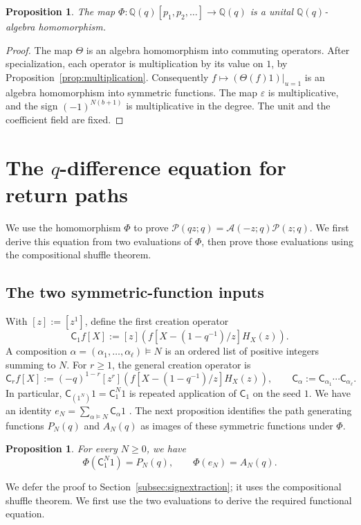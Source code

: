 \documentclass[12pt,reqno]{amsart}
\numberwithin{equation}{section}
\newtheorem{proposition}[theorem]{Proposition}
\theoremstyle{definition}
\theoremstyle{remark}
\theoremstyle{plain}
\newcommand{\QQ}{\mathbb Q}
\newcommand{\Cop}{\mathsf C}
\newcommand{\Aseries}{\mathscr A}
\newcommand{\Pseries}{\mathscr P}
\begin{document}
\begin{proposition}\label{prop:PhiHom}
The map $\Phi:\QQ(q)[p_1,p_2,\ldots]\to\QQ(q)$ is a unital
$\QQ(q)$-algebra homomorphism.
\end{proposition}
\begin{proof}
The map $\Theta$ is an algebra homomorphism into commuting operators.
After specialization, each operator is multiplication by its value on
$1$, by Proposition~\ref{prop:multiplication}.
Consequently $f\mapsto(\Theta(f)1)|_{u=1}$ is an algebra homomorphism
into symmetric functions.  The map $\varepsilon$ is multiplicative,
and the sign $(-1)^{N(b+1)}$ is multiplicative in the degree.
The unit and the coefficient field are fixed.
\end{proof}




\section{The \texorpdfstring{$q$}{q}-difference equation for return paths}\label{sec:Euler}
We use the homomorphism $\Phi$ to prove
$\Pseries(qz;q)=\Aseries(-z;q)\Pseries(z;q)$.
We first derive this equation from two evaluations of $\Phi$, then
prove those evaluations using the compositional shuffle theorem.

\subsection{The two symmetric-function inputs}
With $[z]:=[z^1]$, define the first creation operator
\begin{equation}\label{eq:C1}
 \Cop_1 f[X]:=[z]\left(f[X-(1-q^{-1})/z]H_X(z)\right).
\end{equation}
A composition $\alpha=(\alpha_1,\ldots,\alpha_\ell)\models N$ is an ordered list of positive integers summing to $N$. For $r\ge1$, the general creation operator is
\[
 \Cop_r f[X]:=(-q)^{1-r}[z^r]\left(f[X-(1-q^{-1})/z]H_X(z)\right),
 \qquad \Cop_\alpha:=\Cop_{\alpha_1}\cdots\Cop_{\alpha_\ell}.
\]
In particular, $\Cop_{(1^N)}1=\Cop_1^N 1$ is repeated application of $\Cop_1$ on the seed $1$. We have an identity $e_N=\sum_{\alpha\models N}\Cop_\alpha1$ \cite[(1.6)]{BGLX}. 
The next proposition identifies the path generating functions $P_N(q)$ and $A_N(q)$ as images of these symmetric functions under $\Phi$.

\begin{proposition}\label{prop:seedvalues}
For every $N\ge0$, we have
\begin{equation}\label{eq:Phivalues}
 \Phi(\Cop_1^N1)=P_N(q),\qquad
 \Phi(e_N)=A_N(q).
\end{equation}
\end{proposition}
We defer the proof to Section~\ref{subsec:signextraction}; it uses the compositional shuffle theorem.  We first use the two evaluations
to derive the required functional equation.
\end{document}
